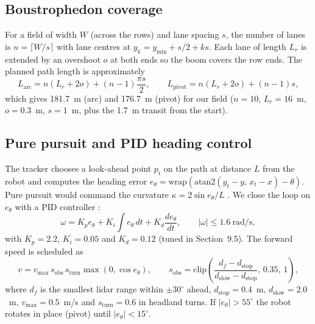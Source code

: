 \documentclass[12pt,a4paper]{article}
\begin{document}
\subsection{Boustrophedon coverage}
For a field of width $W$ (across the rows) and lane spacing $s$, the number of lanes is $n=\lceil W/s\rceil$ with lane centres at $y_k = y_{\min} + s/2 + k s$. Each lane of length $L_r$ is extended by an overshoot $o$ at both ends so the boom covers the row ends. The planned path length is approximately
\begin{equation}
L_{\mathrm{arc}} = n(L_r+2o) + (n-1)\frac{\pi s}{2}, \qquad L_{\mathrm{pivot}} = n(L_r+2o) + (n-1)s,
\end{equation}
which gives 181.7~m (arc) and 176.7~m (pivot) for our field ($n=10$, $L_r=16$~m, $o=0.3$~m, $s=1$~m, plus the 1.7~m transit from the start).

\subsection{Pure pursuit and PID heading control}
The tracker chooses a look-ahead point $p_t$ on the path at distance $L$ from the robot and computes the heading error $e_\theta = \mathrm{wrap}(\mathrm{atan2}(y_t-y,\,x_t-x)-\theta)$. Pure pursuit would command the curvature $\kappa = 2\sin e_\theta / L$ \cite{coulter1992}. We close the loop on $e_\theta$ with a PID controller \cite{astrom2008}:
\begin{equation}
\omega = K_p e_\theta + K_i \int e_\theta\,dt + K_d \frac{de_\theta}{dt}, \qquad |\omega| \le 1.6~\mathrm{rad/s},
\end{equation}
with $K_p=2.2$, $K_i=0.05$ and $K_d=0.12$ (tuned in Section~9.5). The forward speed is scheduled as
\begin{equation}
v = v_{\max}\, s_{\mathrm{obs}}\, s_{\mathrm{turn}} \max(0,\cos e_\theta), \qquad s_{\mathrm{obs}} = \mathrm{clip}\!\left(\frac{d_f-d_{\mathrm{stop}}}{d_{\mathrm{slow}}-d_{\mathrm{stop}}},\,0.35,\,1\right),
\label{eq:speed}
\end{equation}
where $d_f$ is the smallest lidar range within $\pm30^\circ$ ahead, $d_{\mathrm{stop}}=0.4$~m, $d_{\mathrm{slow}}=2.0$~m, $v_{\max}=0.5$~m/s and $s_{\mathrm{turn}}=0.6$ in headland turns. If $|e_\theta|>55^\circ$ the robot rotates in place (pivot) until $|e_\theta|<15^\circ$.
\end{document}
